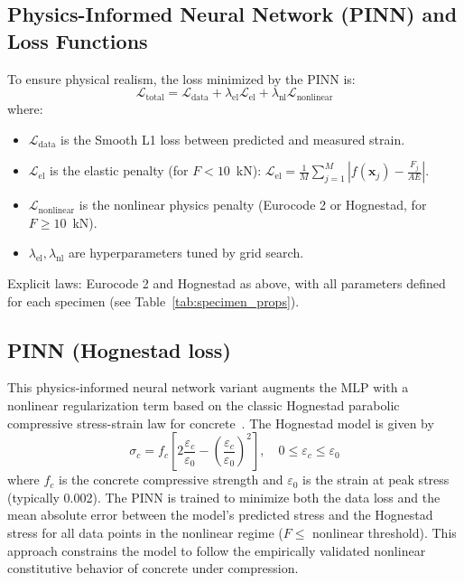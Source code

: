 \documentclass{article}
\begin{document}
\subsection{Physics-Informed Neural Network (PINN) and Loss Functions}
\label{subsec:model_architecture}
To ensure physical realism, the loss minimized by the PINN is:
\begin{equation}
\mathcal{L}_{\mathrm{total}} = \mathcal{L}_{\mathrm{data}} + \lambda_{\mathrm{el}} \mathcal{L}_{\mathrm{el}} + \lambda_{\mathrm{nl}} \mathcal{L}_{\mathrm{nonlinear}}
\end{equation}
where:
\begin{itemize}
    \item $\mathcal{L}_{\mathrm{data}}$ is the Smooth L1 loss between predicted and measured strain.
    \item $\mathcal{L}_{\mathrm{el}}$ is the elastic penalty (for $F < 10$~kN): $\mathcal{L}_{\mathrm{el}} = \frac{1}{M}\sum_{j=1}^M |f(\mathbf{x}_j) - \frac{F_j}{A E}|$.
    \item $\mathcal{L}_{\mathrm{nonlinear}}$ is the nonlinear physics penalty (Eurocode 2 or Hognestad, for $F \geq 10$~kN).
    \item $\lambda_{\mathrm{el}}, \lambda_{\mathrm{nl}}$ are hyperparameters tuned by grid search.
\end{itemize}
Explicit laws: Eurocode 2 and Hognestad as above, with all parameters defined for each specimen (see Table~\ref{tab:specimen_props}).
\subsection{PINN (Hognestad loss)}
This physics-informed neural network variant augments the MLP with a nonlinear regularization term based on the classic Hognestad parabolic compressive stress-strain law for concrete~\cite{hognestad1951study}. The Hognestad model is given by
\begin{equation}
\sigma_{c} = f_c \left[2 \frac{\varepsilon_c}{\varepsilon_0} - \left(\frac{\varepsilon_c}{\varepsilon_0}\right)^2 \right], \quad 0 \leq \varepsilon_c \leq \varepsilon_0
\end{equation}
where $f_c$ is the concrete compressive strength and $\varepsilon_0$ is the strain at peak stress (typically 0.002). The PINN is trained to minimize both the data loss and the mean absolute error between the model's predicted stress and the Hognestad stress for all data points in the nonlinear regime ($F \leq$ nonlinear threshold). This approach constrains the model to follow the empirically validated nonlinear constitutive behavior of concrete under compression.
\end{document}
